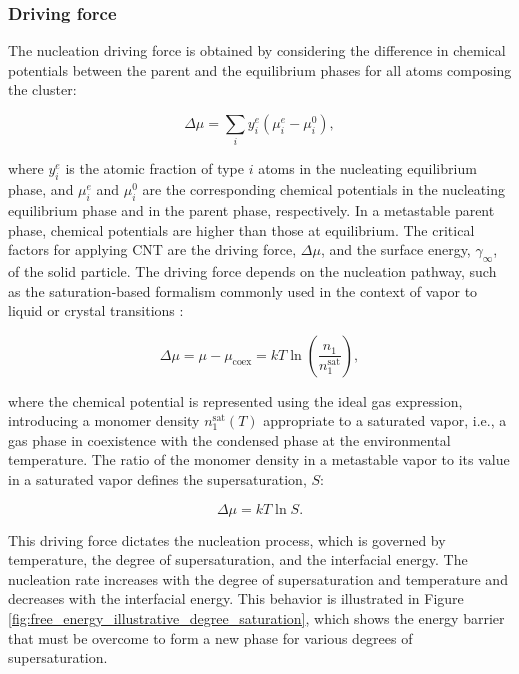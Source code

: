 \subsubsection{Driving force}
The nucleation driving force is obtained by considering the difference in chemical potentials between the parent and the equilibrium phases for all atoms composing the cluster:

\begin{equation}
    \Delta \mu = \sum_i y_i^e (\mu_i^e - \mu_i^0),
\end{equation}

where \(y_i^e\) is the atomic fraction of type \(i\) atoms in the nucleating equilibrium phase, and \(\mu_i^e\) and \(\mu_i^0\) are the corresponding chemical 
potentials in the nucleating equilibrium phase and in the parent phase, respectively. In a metastable parent phase, chemical potentials are higher than those at equilibrium. 
The critical factors for applying CNT are the driving force, \(\Delta \mu\), and the surface energy, \(\gamma_{\infty}\), of the solid particle. The driving force depends 
on the nucleation pathway, such as the saturation-based formalism commonly used in the context of vapor to liquid or crystal transitions \cite{Myerson2019, Ford2004, Sun2009}:

\begin{equation}
    \Delta\mu = \mu - \mu_{\text{coex}} = kT \ln\left(\frac{n_1}{n_1^{\text{sat}}}\right),
\end{equation}

where the chemical potential is represented using the ideal gas expression, introducing a monomer density \(n_1^{\text{sat}}(T)\) appropriate to a saturated vapor, i.e., a gas phase in coexistence with the condensed phase at the environmental temperature. The ratio of the monomer density in a metastable vapor to its value in a saturated vapor defines the supersaturation, \(S\):

\begin{equation}
    \Delta\mu = kT \ln S.
\end{equation}

This driving force dictates the nucleation process, which is governed by temperature, the degree of supersaturation, and the interfacial energy. The nucleation rate increases with the degree of supersaturation and temperature and decreases with the interfacial energy. This behavior is illustrated in Figure \ref{fig:free_energy_illustrative_degree_saturation}, which shows the energy barrier that must be overcome to form a new phase for various degrees of supersaturation.

